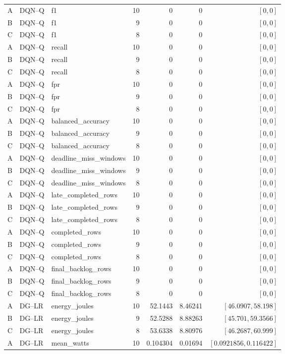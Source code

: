 \begin{longtable}{lllrrrr}
A & DQN--Q & f1 & 10 & 0 & 0 & $[0,0]$\\
B & DQN--Q & f1 & 9 & 0 & 0 & $[0,0]$\\
C & DQN--Q & f1 & 8 & 0 & 0 & $[0,0]$\\
A & DQN--Q & recall & 10 & 0 & 0 & $[0,0]$\\
B & DQN--Q & recall & 9 & 0 & 0 & $[0,0]$\\
C & DQN--Q & recall & 8 & 0 & 0 & $[0,0]$\\
A & DQN--Q & fpr & 10 & 0 & 0 & $[0,0]$\\
B & DQN--Q & fpr & 9 & 0 & 0 & $[0,0]$\\
C & DQN--Q & fpr & 8 & 0 & 0 & $[0,0]$\\
A & DQN--Q & balanced\_accuracy & 10 & 0 & 0 & $[0,0]$\\
B & DQN--Q & balanced\_accuracy & 9 & 0 & 0 & $[0,0]$\\
C & DQN--Q & balanced\_accuracy & 8 & 0 & 0 & $[0,0]$\\
A & DQN--Q & deadline\_miss\_windows & 10 & 0 & 0 & $[0,0]$\\
B & DQN--Q & deadline\_miss\_windows & 9 & 0 & 0 & $[0,0]$\\
C & DQN--Q & deadline\_miss\_windows & 8 & 0 & 0 & $[0,0]$\\
A & DQN--Q & late\_completed\_rows & 10 & 0 & 0 & $[0,0]$\\
B & DQN--Q & late\_completed\_rows & 9 & 0 & 0 & $[0,0]$\\
C & DQN--Q & late\_completed\_rows & 8 & 0 & 0 & $[0,0]$\\
A & DQN--Q & completed\_rows & 10 & 0 & 0 & $[0,0]$\\
B & DQN--Q & completed\_rows & 9 & 0 & 0 & $[0,0]$\\
C & DQN--Q & completed\_rows & 8 & 0 & 0 & $[0,0]$\\
A & DQN--Q & final\_backlog\_rows & 10 & 0 & 0 & $[0,0]$\\
B & DQN--Q & final\_backlog\_rows & 9 & 0 & 0 & $[0,0]$\\
C & DQN--Q & final\_backlog\_rows & 8 & 0 & 0 & $[0,0]$\\
A & DG--LR & energy\_joules & 10 & 52.1443 & 8.46241 & $[46.0907,58.198]$\\
B & DG--LR & energy\_joules & 9 & 52.5288 & 8.88263 & $[45.701,59.3566]$\\
C & DG--LR & energy\_joules & 8 & 53.6338 & 8.80976 & $[46.2687,60.999]$\\
A & DG--LR & mean\_watts & 10 & 0.104304 & 0.01694 & $[0.0921856,0.116422]$\\

\end{longtable}
